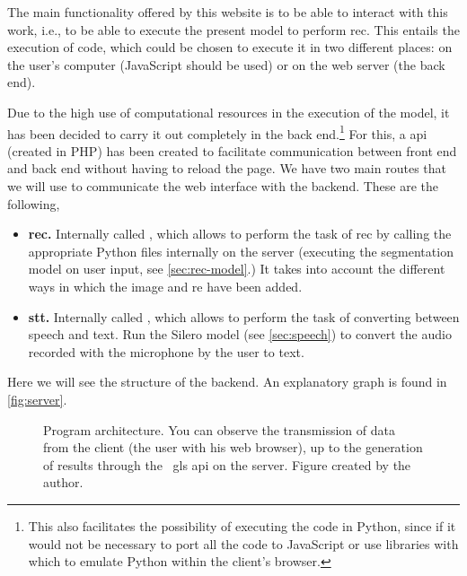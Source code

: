 The main functionality offered by this website is to be able to interact with
this work, i.e., to be able to execute the present model to perform
\gls{rec}. This entails the execution of code, which could be chosen to execute
it in two different places: on the user's computer (JavaScript should be used)
or on the web server (the back end).

Due to the high use of computational resources in the execution of the model,
it has been decided to carry it out completely in the back end.\footnote{This
  also facilitates the possibility of executing the code in Python, since if it
  would not be necessary to port all the code to JavaScript or use libraries
  with which to emulate Python within the client's browser.} For this, a
\gls{api} (created in PHP) has been created to facilitate communication between
front end and back end without having to reload the page. We have two main
routes that we will use to communicate the web interface with the
backend. These are the following,
\begin{itemize}
  \item \textbf{\gls{rec}.} Internally called , which
  allows to perform the task of \gls{rec} by calling the appropriate Python
  files internally on the server (executing the segmentation model on user
  input, see \vref{sec:rec-model}.) It takes into account the different ways in
  which the image and \gls{re} have been added.
  \item \textbf{\gls{stt}.} Internally called , which allows
  to perform the task of converting between speech and text. Run the Silero
  model (see \vref{sec:speech}) to convert the audio recorded with the
  microphone by the user to text.
\end{itemize}

Here we will see the structure of the backend. An explanatory graph is found in
\vref{fig:server}.

\begin{figure}[p]
  \centering
  \resizebox{\textwidth}{!}{}
  \caption[Program architecture]{Program architecture. You can observe the
    transmission of data from the client (the user with his web browser), up to
    the generation of results through the \ gls {api} on the server. Figure
    created by the author.}\label{fig:server}
\end{figure}
